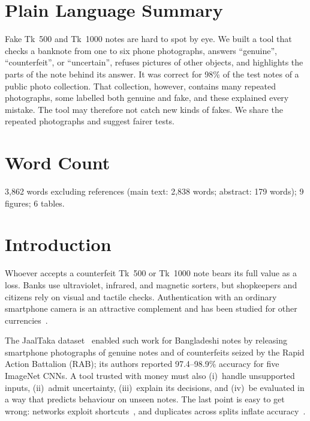 \documentclass[pdflatex,iicol,sn-mathphys-num]{sn-jnl}
\begin{document}
\section*{Plain Language Summary}
Fake Tk~500 and Tk~1000 notes are hard to spot by eye. We built a tool that checks a
banknote from one to six phone photographs, answers ``genuine'', ``counterfeit'', or
``uncertain'', refuses pictures of other objects, and highlights the parts of the note
behind its answer. It was correct for 98\% of the test notes of a public photo
collection. That collection, however, contains many repeated photographs, some labelled
both genuine and fake, and these explained every mistake. The tool may therefore not
catch new kinds of fakes. We share the repeated photographs and suggest fairer tests.

\section*{Word Count}
3{,}862 words excluding references (main text: 2{,}838 words; abstract: 179 words);
9 figures; 6 tables.

\section{Introduction}\label{sec:intro}

Whoever accepts a counterfeit Tk~500 or Tk~1000 note bears its full value as a loss.
Banks use ultraviolet, infrared, and magnetic sorters, but shopkeepers and citizens rely
on visual and tactile checks. Authentication with an ordinary smartphone camera is an
attractive complement and has been studied for other currencies~\cite{pham2020,pham2022}.

The JaalTaka dataset~\cite{piyas2025jaaltaka} enabled such work for Bangladeshi notes by
releasing smartphone photographs of genuine notes and of counterfeits seized by the Rapid
Action Battalion (RAB); its authors reported 97.4--98.9\% accuracy for five ImageNet
CNNs. A tool trusted with money must also (i)~handle unsupported inputs,
(ii)~admit uncertainty, (iii)~explain its decisions, and (iv)~be evaluated in a way that predicts behaviour on
unseen notes. The last point is easy to get wrong: networks exploit
shortcuts~\cite{geirhos2020shortcut}, and duplicates across splits inflate
accuracy~\cite{kaufman2012leakage,barz2020cifair,kapoor2023leakage}.
\end{document}
